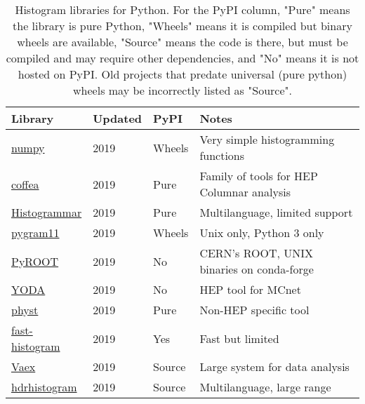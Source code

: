 \documentclass{webofc}
\begin{document}
\begin{table}
	\centering
	\caption{Histogram libraries for Python. For the PyPI column, "Pure" means the library is pure Python, "Wheels" means it is compiled but binary wheels are available, "Source" means the code is there, but must be compiled and may require other dependencies, and "No" means it is not hosted on PyPI. Old projects that predate universal (pure python) wheels may be incorrectly listed as "Source".}
	\label{tab-libraries}       %
	\begin{tabular}{llll}
		\hline
		Library                                                                      & Updated & PyPI   & Notes                                                \\ \hline
		\href{https://www.numpy.org/}{numpy}                                         & 2019         & Wheels & Very simple histogramming functions                  \\
		\href{https://coffeateam.github.io/coffea/notebooks/histograms.html}{coffea} & 2019         & Pure   & Family of tools for HEP Columnar analysis            \\
		\href{https://histogrammar.org}{Histogrammar}                                & 2019         & Pure   & Multilanguage, limited support                       \\
		\href{https://pygram11.readthedocs.io}{pygram11}                             & 2019         & Wheels & Unix only, Python 3 only                             \\
		\href{https://root.cern.ch/pyroot}{PyROOT}                                   & 2019         & No     & CERN's ROOT, UNIX binaries on conda-forge            \\
		\href{https://yoda.hepforge.org}{YODA}                                       & 2019         & No     & HEP tool for MCnet                                   \\
		\href{https://physt.readthedocs.io/en/latest/tutorial.html}{physt}           & 2019         & Pure   & Non-HEP specific tool                                \\
		\href{https://github.com/astrofrog/fast-histogram}{fast-histogram}           & 2019         & Yes    & Fast but limited                                     \\
		\href{https://vaex.io}{Vaex}                                                 & 2019         & Source & Large system for data analysis                       \\
		\href{https://pypi.org/project/hdrhistogram/}{hdrhistogram}                  & 2019         & Source & Multilanguage, large range                           \\

\end{tabular}
\end{table}
\end{document}
